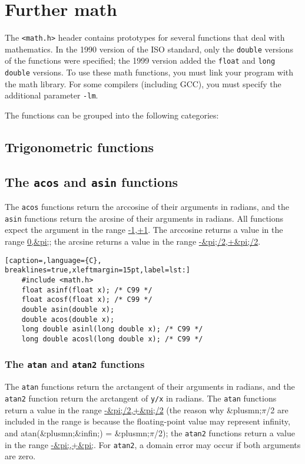 \section{Further math}
The \texttt{\textless{}math.h\textgreater{}} header contains prototypes for
several functions that deal with mathematics. In the 1990 version of the ISO
standard, only the \texttt{double} versions of the functions were specified;
the 1999 version added the \texttt{float} and \texttt{long double} versions. To
use these math functions, you must link your program with the math library. For
some compilers (including GCC), you must specify the additional parameter
\texttt{-lm}.

The functions can be grouped into the following categories:
\subsection{Trigonometric functions}
\subsection{The \texttt{acos} and \texttt{asin} functions}
The \texttt{acos} functions return the arccosine of their arguments in radians,
and the \texttt{asin} functions return the arcsine of their arguments in
radians. All functions expect the argument in the range \url{-1,+1}. The
arccosine returns a value in the range \url{0,&pi;}; the arcsine returns a
value in the range \url{-&pi;/2,+&pi;/2}.

\lstset{basicstyle=\scriptsize, numbers=left, captionpos=b, tabsize=4}
\begin{lstlisting}[caption=,language={C},
breaklines=true,xleftmargin=15pt,label=lst:]
	#include <math.h>
	float asinf(float x); /* C99 */
	float acosf(float x); /* C99 */
	double asin(double x);
	double acos(double x);
	long double asinl(long double x); /* C99 */
	long double acosl(long double x); /* C99 */
\end{lstlisting}

\subsubsection{The \texttt{atan} and \texttt{atan2} functions}
The \texttt{atan} functions return the arctangent of their arguments in
radians, and the \texttt{atan2} function return the arctangent of \texttt{y/x}
in radians. The \texttt{atan} functions return a value in the range
\url{-&pi;/2,+&pi;/2} (the reason why \&plusmn;\ensuremath{\pi}/2 are included
in the range is because the floating-point value may represent infinity, and
atan(\&plusmn;\&infin;) = \&plusmn;\ensuremath{\pi}/2); the \texttt{atan2}
functions return a value in the range \url{-&pi;,+&pi;}. For \texttt{atan2}, a
domain error may occur if both arguments are zero.

